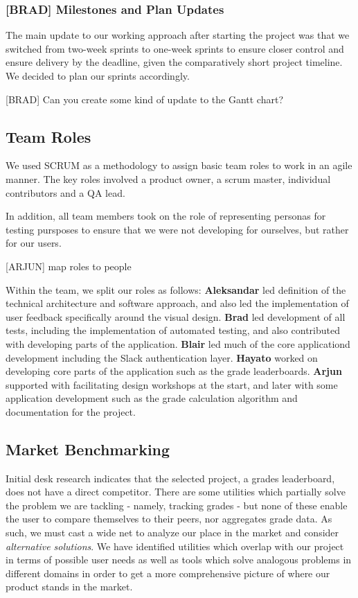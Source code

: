 \subsubsection{[BRAD] Milestones and Plan Updates} \label{sec:milestones_updates}
The main update to our working approach after starting the project was that we switched from two-week sprints to one-week sprints to ensure closer control and ensure delivery by the deadline, given the comparatively short project timeline. We decided to plan our sprints accordingly.

[BRAD] Can you create some kind of update to the Gantt chart?

\subsection{Team Roles}\label{sec:roles}

We used SCRUM as a methodology to assign basic team roles to work in an agile manner. The key roles involved a product owner, a scrum master, individual contributors and a QA lead.

In addition, all team members took on the role of representing personas for testing pursposes to ensure that we were not developing for ourselves, but rather for our users.

[ARJUN] map roles to people

Within the team, we split our roles as follows:
\textbf{Aleksandar}  led definition of the technical architecture and software approach, and also led the implementation of user feedback specifically around the visual design.
\textbf{Brad}  led development of all tests, including the implementation of automated testing, and also contributed with developing parts of the application.
\textbf{Blair}  led much of the core applicationd development including the Slack authentication layer.
\textbf{Hayato}  worked on developing core parts of the application such as the grade leaderboards.
\textbf{Arjun}  supported with facilitating design workshops at the start, and later with some application development such as the grade calculation algorithm and documentation for the project.

\subsection{Market Benchmarking}
Initial desk research indicates that the selected project, a grades leaderboard, does not have a direct competitor. There are some utilities which partially solve the problem we are tackling - namely, tracking grades - but none of these enable the user to compare themselves to their peers, nor aggregates grade data. As such, we must cast a wide net to analyze our place in the market and consider \emph{alternative solutions}. We have identified utilities which overlap with our project in terms of possible user needs as well as tools which solve analogous problems in different domains in order to get a more comprehensive picture of where our product stands in the market.

